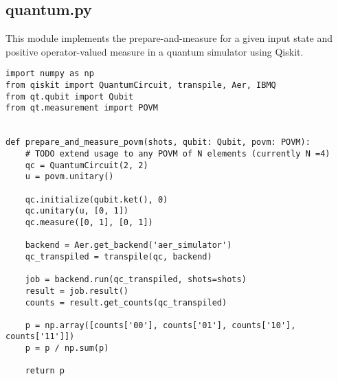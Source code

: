 \subsection{quantum.py}\label{section:listings_quantum}
This module implements the prepare-and-measure for a given input state and positive operator-valued measure in a quantum simulator using Qiskit. 
\begin{verbatim}
import numpy as np
from qiskit import QuantumCircuit, transpile, Aer, IBMQ
from qt.qubit import Qubit
from qt.measurement import POVM


def prepare_and_measure_povm(shots, qubit: Qubit, povm: POVM):
    # TODO extend usage to any POVM of N elements (currently N =4)
    qc = QuantumCircuit(2, 2)
    u = povm.unitary()

    qc.initialize(qubit.ket(), 0)
    qc.unitary(u, [0, 1])
    qc.measure([0, 1], [0, 1])

    backend = Aer.get_backend('aer_simulator')
    qc_transpiled = transpile(qc, backend)

    job = backend.run(qc_transpiled, shots=shots)
    result = job.result()
    counts = result.get_counts(qc_transpiled)

    p = np.array([counts['00'], counts['01'], counts['10'], counts['11']])
    p = p / np.sum(p)

    return p
\end{verbatim}